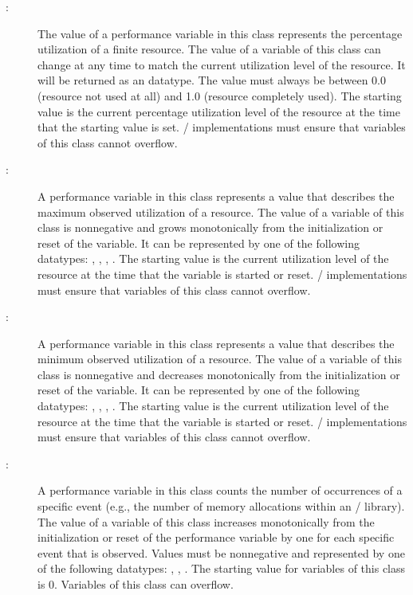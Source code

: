 \begin{sloppy}
\begin{description}
\item[:]The value of a performance
  variable in this class represents the percentage utilization of a finite
  resource.  The value of a variable of this class can change at any time
  to match the current utilization level of the resource.  It will be
  returned as an  datatype.  The value must always be
  between 0.0 (resource not used at all) and 1.0 (resource completely
  used).  The starting value is the current percentage utilization level of
  the resource at the time that the starting value is set.  \MPI/
  implementations must ensure that variables of this class cannot overflow.

\item[:]A performance variable
  in this class represents a value that describes the maximum observed
  utilization of a resource.  The value of a variable of this class is
  nonnegative and grows monotonically from the initialization or reset of
  the variable.  It can be represented by one of the following datatypes:
  , ,
  , .  The starting
  value is the current utilization level of the resource at the time that
  the variable is started or reset.  \MPI/ implementations must ensure that
  variables of this class cannot overflow.

\item[:]A performance variable in
  this class represents a value that describes the minimum observed
  utilization of a resource.  The value of a variable of this class is
  nonnegative and decreases monotonically from the initialization or reset
  of the variable.  It can be represented by one of the following
  datatypes: , ,
  , .  The starting
  value is the current utilization level of the resource at the time that
  the variable is started or reset.  \MPI/ implementations must ensure that
  variables of this class cannot overflow.

\item[:]A performance variable in this
  class counts the number of occurrences of a specific event (e.g., the
  number of memory allocations within an \MPI/ library).  The value of a
  variable of this class increases monotonically from the initialization or
  reset of the performance variable by one for each specific event that is
  observed.  Values must be nonnegative and represented by one of the
  following datatypes: , ,
  .  The starting value for variables of
  this class is 0.  Variables of this class can overflow.


\end{description}
\end{sloppy}
